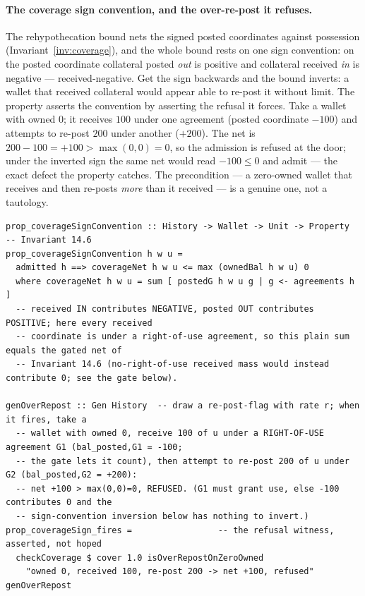 \documentclass[11pt,a4paper]{article}
\begin{document}
\paragraph{The coverage sign convention, and the over-re-post it refuses.}
The rehypothecation bound nets the signed posted coordinates against possession
(Invariant~\ref{inv:coverage}), and the whole bound rests on one sign convention: on
the posted coordinate collateral posted \emph{out} is positive and collateral
received \emph{in} is negative --- received-negative. Get the sign backwards and the
bound inverts: a wallet that received collateral would appear able to re-post it
without limit. The property asserts the convention by asserting the refusal it
forces. Take a wallet with owned $0$; it receives $100$ under one agreement (posted
coordinate $-100$) and attempts to re-post $200$ under another ($+200$). The net is
$200-100=+100>\max(0,0)=0$, so the admission is refused at the door; under the
inverted sign the same net would read $-100\le 0$ and admit --- the exact defect the
property catches. The precondition --- a zero-owned wallet that receives and then
re-posts \emph{more} than it received --- is a genuine one, not a tautology.

\begin{lstlisting}
prop_coverageSignConvention :: History -> Wallet -> Unit -> Property  -- Invariant 14.6
prop_coverageSignConvention h w u =
  admitted h ==> coverageNet h w u <= max (ownedBal h w u) 0
  where coverageNet h w u = sum [ postedG h w u g | g <- agreements h ]
  -- received IN contributes NEGATIVE, posted OUT contributes POSITIVE; here every received
  -- coordinate is under a right-of-use agreement, so this plain sum equals the gated net of
  -- Invariant 14.6 (no-right-of-use received mass would instead contribute 0; see the gate below).

genOverRepost :: Gen History  -- draw a re-post-flag with rate r; when it fires, take a
  -- wallet with owned 0, receive 100 of u under a RIGHT-OF-USE agreement G1 (bal_posted,G1 = -100;
  -- the gate lets it count), then attempt to re-post 200 of u under G2 (bal_posted,G2 = +200):
  -- net +100 > max(0,0)=0, REFUSED. (G1 must grant use, else -100 contributes 0 and the
  -- sign-convention inversion below has nothing to invert.)
prop_coverageSign_fires =                 -- the refusal witness, asserted, not hoped
  checkCoverage $ cover 1.0 isOverRepostOnZeroOwned
    "owned 0, received 100, re-post 200 -> net +100, refused" genOverRepost
\end{lstlisting}
\end{document}
